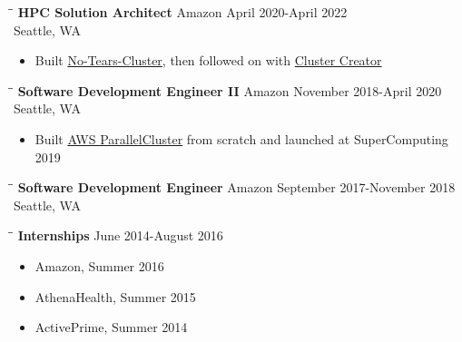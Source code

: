\documentclass{res}
\begin{document}
\begin{resume}
\begin{tabbing}
   \hspace{2.5in}\= \hspace{2.6in}\= \kill %
    {\bf HPC Solution Architect} \>Amazon     \>April 2020-April 2022\\
                             \>Seattle, WA
   \end{tabbing}\vspace{-10pt}      %
   \begin{itemize}
   \setlength\itemsep{0em}
\item Built \href{https://github.com/aws-samples/no-tears-cluster}{No-Tears-Cluster}, then followed on with \href{https://cluster-creator.swsmith.cc/}{Cluster Creator}
    \end{itemize}
\vspace{-0.10in}
 \begin{tabbing}
   \hspace{2.5in}\= \hspace{2.6in}\= \kill %
    {\bf Software Development Engineer II} \>Amazon     \>November 2018-April 2020\\
                             \>Seattle, WA
   \end{tabbing}\vspace{-10pt}      %
   \begin{itemize}
   \setlength\itemsep{0em}
\item Built \href{https://github.com/aws/aws-parallelcluster}{AWS ParallelCluster} from scratch and launched at SuperComputing 2019
    \end{itemize}
\vspace{-0.10in}
 \begin{tabbing}
   \hspace{2.5in}\= \hspace{2.6in}\= \kill %
    {\bf Software Development Engineer} \>Amazon     \>September 2017-November 2018\\
                             \>Seattle, WA
   \end{tabbing}\vspace{-10pt}      %
\vspace{-0.15in}
 \begin{tabbing}
   \hspace{2.5in}\= \hspace{2.6in}\= \kill %
    {\bf Internships} \>     \>June 2014-August 2016
   \end{tabbing}\vspace{-10pt}      %
   \begin{itemize}
   \setlength\itemsep{0em}
   \item Amazon, Summer 2016
   \item AthenaHealth, Summer 2015
   \item ActivePrime, Summer 2014
    \end{itemize}

\end{resume}
\end{document}
